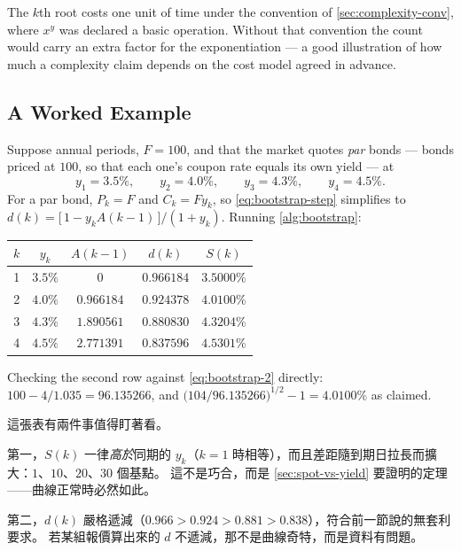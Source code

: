 \begin{note}
	The $k$th root costs one unit of time under the convention of \autoref{sec:complexity-conv}, where $x^{y}$ was declared a basic operation.
	Without that convention the count would carry an extra factor for the exponentiation --- a good illustration of how much a complexity claim depends on the cost model agreed in advance.
\end{note}
\suppend

\subsection{A Worked Example}

\suppstart
\begin{eg}
	Suppose annual periods, $F=100$, and that the market quotes \emph{par} bonds --- bonds priced at $100$, so that each one's coupon rate equals its own yield --- at
	\[
		y_{1}=3.5\%,\qquad y_{2}=4.0\%,\qquad y_{3}=4.3\%,\qquad y_{4}=4.5\% .
	\]
	For a par bond, $P_{k}=F$ and $C_{k}=F y_{k}$, so \eqref{eq:bootstrap-step} simplifies to
	$d(k) = \bigl[\,1-y_{k}A(k-1)\,\bigr]/(1+y_{k})$.
	Running \autoref{alg:bootstrap}:

	\begin{center}
		\small
		\begin{tabular}{@{}c c c c c@{}}
			\toprule
			$k$ & $y_{k}$ & $A(k-1)$ & $d(k)$   & $S(k)$   \\
			\midrule
			1   & $3.5\%$ & $0$      & $0.966184$ & $3.5000\%$ \\
			2   & $4.0\%$ & $0.966184$ & $0.924378$ & $4.0100\%$ \\
			3   & $4.3\%$ & $1.890561$ & $0.880830$ & $4.3204\%$ \\
			4   & $4.5\%$ & $2.771391$ & $0.837596$ & $4.5301\%$ \\
			\bottomrule
		\end{tabular}
	\end{center}

	Checking the second row against \eqref{eq:bootstrap-2} directly: $100 - 4/1.035 = 96.135266$, and $\bigl(104/96.135266\bigr)^{1/2}-1 = 4.0100\%$ as claimed.
\end{eg}

\begin{remark}
	這張表有兩件事值得盯著看。

	第一，$S(k)$ 一律\emph{高於}同期的 $y_{k}$（$k=1$ 時相等），而且差距隨到期日拉長而擴大：$1$、$10$、$20$、$30$ 個基點。
	這不是巧合，而是 \autoref{sec:spot-vs-yield} 要證明的定理——曲線正常時必然如此。

	第二，$d(k)$ 嚴格遞減（$0.966 > 0.924 > 0.881 > 0.838$），符合前一節說的無套利要求。
	若某組報價算出來的 $d$ 不遞減，那不是曲線奇特，而是資料有問題。
\end{remark}
\suppend

